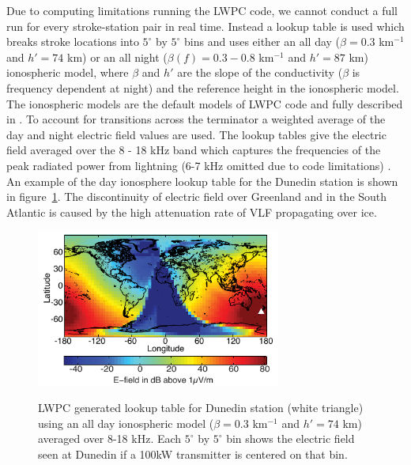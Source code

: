 Due to computing limitations running the LWPC code, we cannot conduct a full run for every stroke-station pair in real time.
Instead a lookup table is used which breaks stroke locations into $5^{\circ}$ by $5^{\circ}$ bins and uses either an all day ($\beta=0.3$ km$^{-1}$ and $h'=74$ km) or an all night ($\beta(f)=0.3-0.8$ km$^{-1}$ and $h'=87$ km) ionospheric model, where $\beta$ and $h'$ are the slope of the conductivity ($\beta$ is frequency dependent at night) and the reference height in the ionospheric model.
The ionospheric models are the default models of LWPC code and fully described in \citet{Ferguson1998}. 
To account for transitions across the terminator a weighted average of the day and night electric field values are used.
The lookup tables give the electric field averaged over the 8 - 18 kHz band which captures the frequencies of the peak radiated power from lightning (6-7 kHz omitted due to code limitations) \citep{Volland1995}.
An example of the day ionosphere lookup table for the Dunedin station is shown in figure~\ref{lookup}.
The discontinuity of electric field over Greenland and in the South Atlantic is caused by the high attenuation rate of VLF propagating over ice.

 \begin{figure}[t]
 \noindent\includegraphics[width=19pc,angle=0]{energy/Figures/PPS_Lookup.pdf}\\
 \caption{LWPC generated lookup table for Dunedin station (white triangle) using an all day ionospheric model ($\beta=0.3$ km$^{-1}$ and $h'=74$ km) averaged over 8-18 kHz. Each $5^{\circ}$ by $5^{\circ}$ bin shows the electric field seen at Dunedin if a 100kW transmitter is centered on that bin.}
 \label{lookup}
 \end{figure}

